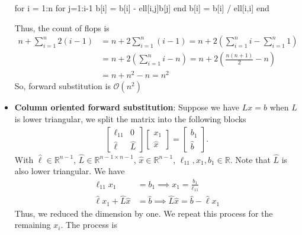 \documentclass{report}
\begin{document}
\begin{itemize}
                \begin{jlcode}
                for i = 1:n
                    for j=1:i-1
                        b[i] = b[i] - ell[i,j]b[j]
                    end
                    b[i] = b[i] / ell[i,i]
                end
                \end{jlcode}
            Thus, the count of flops is
            \begin{align*}
                n+\sum_{i=1}^{n}2(i-1) &= n+2 \sum_{i=1}^{n}(i-1) = n+2 \left( \sum_{i=1}^{n}i - \sum_{i=1}^{n} 1\right)  \\
                   &= n + 2 \left(\sum_{i=1}^{n}i - n\right) = n+ 2 \left(\frac{n(n+1)}{2}-n\right) \\
                   &=n + n^{2} - n = n^{2}
            \end{align*}
            So, forward substitution is $\mathcal{O}(n^{2})$
        \item \textbf{Column oriented forward substitution}: Suppose we have $Lx = b$ when $L$ is lower triangular, we split the matrix into the following blocks
            \begin{align*}
                \begin{bmatrix}
                    \ell_{11} & 0 \\
                    \hat{\ell} & \hat{L}
                \end{bmatrix}
                \begin{bmatrix}
                    x_{1} \\ \hat{x} 
                \end{bmatrix}
                = \begin{bmatrix}
                    b_{1} \\ \hat{b}
                \end{bmatrix}
            .\end{align*}
            With $\hat{\ell} \in \mathbb{R}^{n-1}$, $\hat{L} \in \mathbb{R}^{n-1 \times n-1} $, $\hat{x} \in \mathbb{R}^{n-1}$, $\ell_{11}, x_{1}, b_{1} \in \mathbb{R}$. Note that $\hat{L}$ is also lower triangular.
            \bigbreak \noindent 
            We have
            \begin{align*}
                \ell_{11}x_{1} &= b_{1} \implies x_{1} = \frac{b_{1}}{\ell_{11}} \\
                \hat{\ell}x_{1} + \hat{L}\hat{x} &= \hat{b} \implies \hat{L}\hat{x} = \hat{b} - \hat{\ell}x_{1}
            \end{align*}
            Thus, we reduced the dimension by one. We repeat this process for the remaining $x_{i}$. The process is 

\end{itemize}
\end{document}
